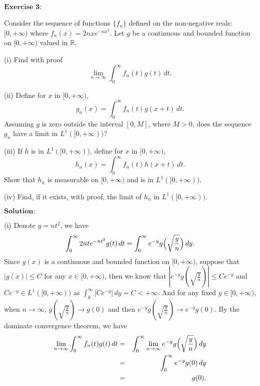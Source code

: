 \documentclass[12pt,a4paper]{ctexart}
\begin{document}
\newpage


$\underline{\textbf{Exercise 3:}}$

Consider the sequence of functions $\{f_{n}\}$ defined on the non-negative reals: $[0, + \infty)$ where $f_{n}(x) = 2 n x e^{-n x^{2}}$. Let $g$ be a continuous and bounded function on $[0, + \infty)$ valued in $\mathbb{R}$.

(i) Find with proof
\begin{equation*}
   \lim_{n \to \infty} \int_{0}^{\infty} f_{n}(t) g(t) \, d t.
\end{equation*}

(ii) Define for $x$ in $[0, + \infty)$,
\begin{equation*}
   g_{n}(x) = \int_{0}^{\infty} f_{n} (t) g(x + t) \, d t.
\end{equation*}
Assuming $g$ is zero outside the interval $[0, M]$, where $M > 0$, does the sequence $g_{n}$ have a limit in $L^{1}([0, + \infty))$?

(iii) If $h$ is in $L^{1}([0, + \infty))$, define for $x$ in $[0, + \infty)$,
\begin{equation*}
   h_{n}(x) = \int_{0}^{\infty} f_{n} (t) h(x + t) \, d t.
\end{equation*}
Show that $h_{n}$ is measurable on $[0, + \infty)$ and is in $L^{1} ([0, + \infty))$.

(iv) Find, if it exists, with proof, the limit of $h_{n}$ in $L^{1} ([0, + \infty))$.


\vspace{8pt}
$\textbf{Solution:}$

(i) Denote $y = n t^{2}$, we have
\begin{equation*}
    \int_{0}^{\infty} 2 n t e^{- n t^{2}} g(t) \, d t = \int_{0}^{\infty} e^{-y} g \Big{(} \sqrt{\frac{y}{n}} \Big{)} \, d y.
\end{equation*}
Since $g(x)$ is a continuous and bounded function on $[0, + \infty)$, suppose that $| g(x) | \leq C$ for any $x \in [0, + \infty)$, then we know that $| e^{-y} g(\sqrt{\frac{y}{n}}) | \leq C e^{-y}$ and $C e^{-y} \in L^{1}([0, + \infty))$ as $\int_{0}^{\infty} | C e^{-y}| \, d y = C < + \infty$. And for any fixed $y \in [0, + \infty)$, when $n \to \infty$, $g(\sqrt{\frac{y}{n}}) \to g(0)$ and then $e^{-y} g(\sqrt{\frac{y}{n}}) \to e^{-y} g(0)$. By the dominate convergence theorem, we have
\begin{eqnarray*}
\lim_{n \to \infty} \int_{0}^{\infty} f_{n}(t) g(t) \, d t & = &  \int_{0}^{\infty} \lim_{n \to \infty} e^{-y} g \Big{(} \sqrt{\frac{y}{n}} \Big{)} \, d y \\
& = &  \int_{0}^{\infty} e^{-y} g(0) \, d y  \\
& = & g(0).
\end{eqnarray*}
\end{document}
